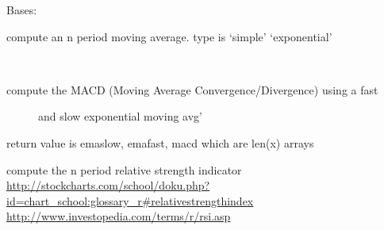 \documentclass[letterpaper,10pt,english]{sphinxmanual}
\begin{document}
\begin{fulllineitems}
\label{SamPy.finance:SamPy.finance.finance.MyLocator}
Bases: 

\end{fulllineitems}



\begin{fulllineitems}
\label{SamPy.finance:SamPy.finance.finance.moving_average}
compute an n period moving average.
type is `simple' \textbar{} `exponential'

\end{fulllineitems}



\begin{fulllineitems}
\label{SamPy.finance:SamPy.finance.finance.moving_average_convergence}~\begin{description}
\item[{compute the MACD (Moving Average Convergence/Divergence) using a fast}] \leavevmode
and slow exponential moving avg'

\end{description}

return value is emaslow, emafast, macd which are len(x) arrays

\end{fulllineitems}



\begin{fulllineitems}
\label{SamPy.finance:SamPy.finance.finance.relative_strength}
compute the n period relative strength indicator
\href{http://stockcharts.com/school/doku.php?id=chart\_school:glossary\_r\#relativestrengthindex}{http://stockcharts.com/school/doku.php?id=chart\_school:glossary\_r\#relativestrengthindex}
\href{http://www.investopedia.com/terms/r/rsi.asp}{http://www.investopedia.com/terms/r/rsi.asp}

\end{fulllineitems}
\end{document}
